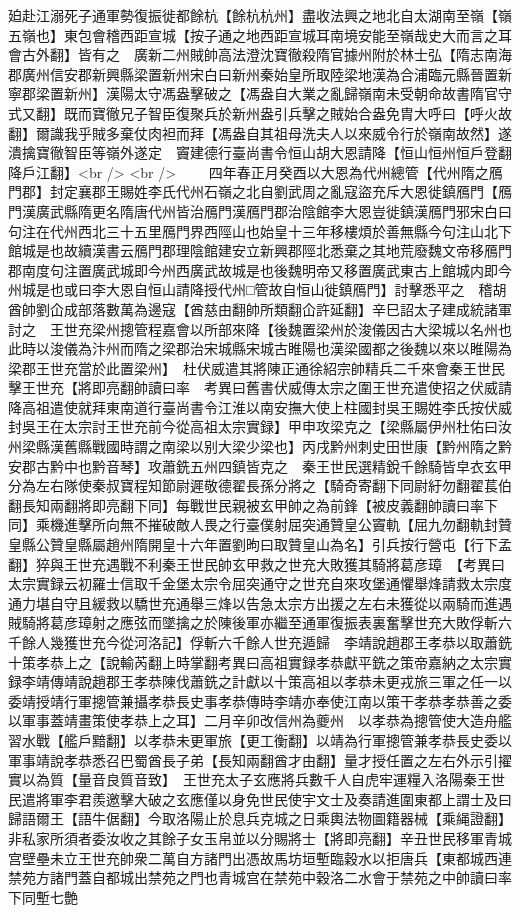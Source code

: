 廹赴江溺死子通軍勢復振徙都餘杭【餘杭杭州】盡收法興之地北自太湖南至嶺【嶺五嶺也】東包會稽西距宣城【按子通之地西距宣城耳南境安能至嶺哉史大而言之耳會古外翻】皆有之　廣新二州賊帥高法澄沈寶徹殺隋官據州附於林士弘【隋志南海郡廣州信安郡新興縣梁置新州宋白曰新州秦始皇所取陸梁地漢為合浦臨元縣晉置新寧郡梁置新州】漢陽太守馮盎擊破之【馮盎自大業之亂歸嶺南未受朝命故書隋官守式又翻】既而寶徹兄子智臣復聚兵於新州盎引兵擊之賊始合盎免胄大呼曰【呼火故翻】爾識我乎賊多棄仗肉袒而拜【馮盎自其祖母洗夫人以來威令行於嶺南故然】遂潰擒寶徹智臣等嶺外遂定　竇建德行臺尚書令恒山胡大恩請降【恒山恒州恒戶登翻降戶江翻】<br />
<br />
　　四年春正月癸酉以大恩為代州總管【代州隋之鴈門郡】封定襄郡王賜姓李氏代州石嶺之北自劉武周之亂寇盜充斥大恩徙鎮鴈門【鴈門漢廣武縣隋更名隋唐代州皆治鴈門漢鴈門郡治陰館李大恩豈徙鎮漢鴈門邪宋白曰句注在代州西北三十五里鴈門界西陘山也始皇十三年移樓煩於善無縣今句注山北下館城是也故續漢書云鴈門郡理陰館建安立新興郡陘北悉棄之其地荒廢魏文帝移鴈門郡南度句注置廣武城即今州西廣武故城是也後魏明帝又移置廣武東古上館城内即今州城是也或曰李大恩自恒山請降授代州□管故自恒山徙鎮鴈門】討擊悉平之　稽胡酋帥劉仚成部落數萬為邊寇【酋慈由翻帥所類翻仚許延翻】辛巳詔太子建成統諸軍討之　王世充梁州摠管程嘉會以所部來降【後魏置梁州於浚儀因古大梁城以名州也此時以浚儀為汴州而隋之梁郡治宋城縣宋城古睢陽也漢梁國都之後魏以來以睢陽為梁郡王世充當於此置梁州】　杜伏威遣其將陳正通徐紹宗帥精兵二千來會秦王世民擊王世充【將即亮翻帥讀曰率　考異曰舊書伏威傳太宗之圍王世充遣使招之伏威請降高祖遣使就拜東南道行臺尚書令江淮以南安撫大使上柱國封吳王賜姓李氏按伏威封吳王在太宗討王世充前今從高祖太宗實録】甲申攻梁克之【梁縣屬伊州杜佑曰汝州梁縣漢舊縣戰國時謂之南梁以别大梁少梁也】丙戌黔州刺史田世康【黔州隋之黔安郡古黔中也黔音琴】攻蕭銑五州四鎮皆克之　秦王世民選精銳千餘騎皆皁衣玄甲分為左右隊使秦叔寶程知節尉遲敬德翟長孫分將之【騎奇寄翻下同尉紆勿翻翟萇伯翻長知兩翻將即亮翻下同】每戰世民親被玄甲帥之為前鋒【被皮義翻帥讀曰率下同】乘機進擊所向無不摧破敵人畏之行臺僕射屈突通贊皇公竇軌【屈九勿翻軌封贊皇縣公贊皇縣屬趙州隋開皇十六年置劉昫曰取贊皇山為名】引兵按行營屯【行下孟翻】猝與王世充遇戰不利秦王世民帥玄甲救之世充大敗獲其騎將葛彦璋　【考異曰太宗實録云初羅士信取千金堡太宗令屈突通守之世充自來攻堡通懼舉烽請救太宗度通力堪自守且緩救以驕世充通舉三烽以告急太宗方出援之左右未獲從以兩騎而進遇賊騎將葛彦璋射之應弦而墜擒之於陳後軍亦繼至通軍復振表裏奮擊世充大敗俘斬六千餘人幾獲世充今從河洛記】俘斬六千餘人世充遁歸　李靖說趙郡王孝恭以取蕭銑十策孝恭上之【說輸芮翻上時掌翻考異曰高祖實録孝恭獻平銑之策帝嘉納之太宗實録李靖傳靖說趙郡王孝恭陳伐蕭銑之計獻以十策高祖以孝恭未更戎旅三軍之任一以委靖授靖行軍摠管兼攝孝恭長史事孝恭傳時李靖亦奉使江南以策干孝恭孝恭善之委以軍事蓋靖畫策使孝恭上之耳】二月辛卯改信州為夔州　以孝恭為摠管使大造舟艦習水戰【艦戶黯翻】以孝恭未更軍旅【更工衡翻】以靖為行軍摠管兼孝恭長史委以軍事靖說孝恭悉召巴蜀酋長子弟【長知兩翻酋才由翻】量才授任置之左右外示引擢實以為質【量音良質音致】　王世充太子玄應將兵數千人自虎牢運糧入洛陽秦王世民遣將軍李君羨邀擊大破之玄應僅以身免世民使宇文士及奏請進圍東都上謂士及曰歸語爾王【語牛倨翻】今取洛陽止於息兵克城之日乘輿法物圖籍器械【乘䋲證翻】非私家所須者委汝收之其餘子女玉帛並以分賜將士【將即亮翻】辛丑世民移軍青城宫壁壘未立王世充帥衆二萬自方諸門出憑故馬坊垣塹臨穀水以拒唐兵【東都城西連禁苑方諸門蓋自都城出禁苑之門也青城宫在禁苑中穀洛二水會于禁苑之中帥讀曰率下同塹七艶